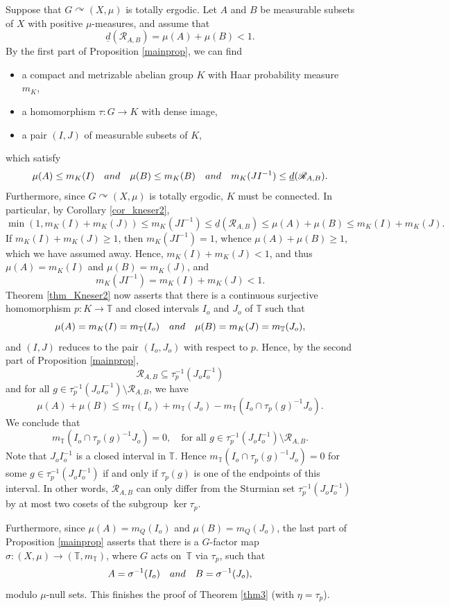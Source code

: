 \documentclass[11pt]{article}
\numberwithin{equation}{section}
\let\mathcal\mathscr
\newcommand{\cR}{\mathcal{R}}
\newcommand{\bT}{\mathbb{T}}
\newcommand{\qand}{\quad\textup{and}\quad}
\let\acts\curvearrowright
\theoremstyle{plain}
\theoremstyle{definition}
\begin{document}
Suppose that $G \acts (X,\mu)$ is totally ergodic. Let $A$ and $B$ be measurable subsets of $X$ with positive $\mu$-measures,
and assume that
\[
\underline{d}(\cR_{A,B}) = \mu(A) + \mu(B) < 1.
\]
By the first part of Proposition \ref{mainprop}, we can find
\begin{itemize}
\item a compact and metrizable abelian group $K$ with Haar probability measure $m_K$,
\item a homomorphism $\tau : G \to K$ with dense image,
\item a pair $(I,J)$ of measurable subsets of $K$,
\end{itemize}
which satisfy
\[
\mu(A) \leq m_K(I) \qand \mu(B) \leq m_K(B) \qand m_K(JI^{-1}) \leq \underline{d}(\cR_{A,B}).
\]
Furthermore, since $G \acts (X,\mu)$ is totally ergodic, $K$ must be connected. In particular, by
Corollary \ref{cor_kneser2},
\[
\min(1,m_K(I) + m_K(J)) \leq m_K(JI^{-1}) \leq \underline{d}(\cR_{A,B}) \leq \mu(A) + \mu(B) \leq m_K(I) + m_K(J).
\]
If $m_K(I) + m_K(J) \geq 1$, then $m_K(JI^{-1}) = 1$, whence $\mu(A) + \mu(B) \geq 1$, which we have assumed away.
Hence, $m_K(I) + m_K(J) < 1$, and thus $\mu(A) = m_K(I)$ and $\mu(B) = m_K(J)$, and
\[
m_K(JI^{-1}) = m_K(I) + m_K(J) < 1.
\]
Theorem \ref{thm_Kneser2} now asserts
that there is a continuous surjective homomorphism \hbox{$p : K \to \bT$} and closed intervals $I_o$ and $J_o$ of $\bT$
such that
\[
\mu(A) = m_K(I) = m_\bT(I_o) \qand \mu(B) = m_K(J) = m_\bT(J_o),
\]
and $(I,J)$ reduces to the pair $(I_o,J_o)$ with respect to $p$. Hence, by the second part of Proposition \ref{mainprop},
\[
\cR_{A,B} \subseteq \tau_p^{-1}(J_o I_o^{-1})
\]
and for all $g \in \tau_p^{-1}(J_o I_o^{-1}) \setminus \cR_{A,B}$, we have
\[
\mu(A) + \mu(B) \leq m_\bT(I_o) + m_\bT(J_o) - m_\bT(I_o \cap \tau_p(g)^{-1}J_o).
\]
We conclude that
\[
m_\bT(I_o \cap \tau_p(g)^{-1}J_o) = 0, \quad \textrm{for all $g \in \tau_p^{-1}(J_o I_o^{-1}) \setminus \cR_{A,B}$}.
\]
Note that $J_o I_o^{-1}$ is a closed interval in $\bT$. Hence $m_\bT(I_o \cap \tau_p(g)^{-1}J_o) = 0$ for some
$g \in \tau_p^{-1}(J_o I_o^{-1})$ if and only if $\tau_p(g)$ is one of the endpoints of this interval. In other words,
$\cR_{A,B}$ can only differ from the Sturmian set $\tau_p^{-1}(J_o I_o^{-1})$ by at most two cosets of the
subgroup $\ker \tau_p$.

Furthermore, since $\mu(A) = m_Q(I_o)$ and $\mu(B) = m_Q(J_o)$, the last part of Proposition \ref{mainprop} asserts
that there is a $G$-factor map $\sigma : (X,\mu) \to (\bT,m_{\bT})$, where $G$ acts on~$\bT$ via $\tau_p$, such that
\[
A = \sigma^{-1}(I_o) \qand B = \sigma^{-1}(J_o),
\]
modulo $\mu$-null sets. This finishes the proof of Theorem \ref{thm3} (with $\eta = \tau_p$).
\end{document}
